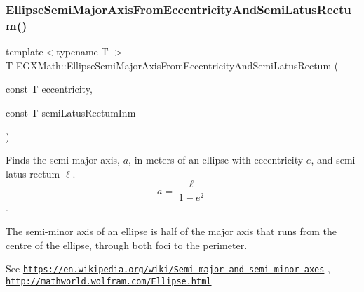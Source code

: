 \mbox{\label{group___e_g_x_math-_geometry-2_d-_ellipse-_semi_major_axis_ga00e19efce15b74c6556cbd5650d7f699}} 
\subsubsection{\texorpdfstring{Ellipse\+Semi\+Major\+Axis\+From\+Eccentricity\+And\+Semi\+Latus\+Rectum()}{EllipseSemiMajorAxisFromEccentricityAndSemiLatusRectum()}}
{\footnotesize\ttfamily template$<$typename T $>$ \\
T E\+G\+X\+Math\+::\+Ellipse\+Semi\+Major\+Axis\+From\+Eccentricity\+And\+Semi\+Latus\+Rectum (\begin{DoxyParamCaption}\item[{const T}]{eccentricity,  }\item[{const T}]{semi\+Latus\+Rectum\+Inm }\end{DoxyParamCaption})}



Finds the semi-\/major axis, $a$, in meters of an ellipse with eccentricity $e$, and semi-\/latus rectum $\ell$. \[ a=\dfrac{\ell}{1 - e^2} \]. 

The semi-\/minor axis of an ellipse is half of the major axis that runs from the centre of the ellipse, through both foci to the perimeter.

See \href{https://en.wikipedia.org/wiki/Semi-major_and_semi-minor_axes}{\tt https\+://en.\+wikipedia.\+org/wiki/\+Semi-\/major\+\_\+and\+\_\+semi-\/minor\+\_\+axes} , \href{http://mathworld.wolfram.com/Ellipse.html}{\tt http\+://mathworld.\+wolfram.\+com/\+Ellipse.\+html}


